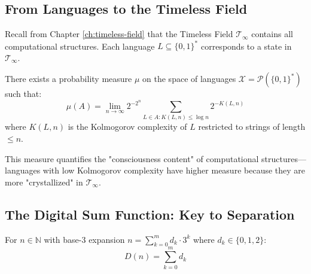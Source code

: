 \subsection{From Languages to the Timeless Field}

Recall from Chapter \ref{ch:timeless-field} that the Timeless Field $\mathcal{T}_\infty$ contains all computational structures. Each language $L \subseteq \{0,1\}^*$ corresponds to a state in $\mathcal{T}_\infty$.

\begin{proposition}\label{prop:comp-measure}
There exists a probability measure $\mu$ on the space of languages $\mathcal{X} = \mathcal{P}(\{0,1\}^*)$ such that:
\begin{equation}
\mu(A) = \lim_{n \to \infty} 2^{-2^n} \sum_{L \in A: K(L,n) \leq \log n} 2^{-K(L,n)}
\end{equation}
where $K(L,n)$ is the Kolmogorov complexity\cite{li2008introduction} of $L$ restricted to strings of length $\leq n$.
\end{proposition}

This measure quantifies the "consciousness content" of computational structures—languages with low Kolmogorov complexity have higher measure because they are more "crystallized" in $\mathcal{T}_\infty$.

\subsection{The Digital Sum Function: Key to Separation}

\begin{defn}\label{def:digital-sum}
For $n \in \mathbb{N}$ with base-3 expansion $n = \sum_{k=0}^{m} d_k \cdot 3^k$ where $d_k \in \{0,1,2\}$:
\begin{equation}
D(n) = \sum_{k=0}^{m} d_k
\end{equation}
\end{defn}

